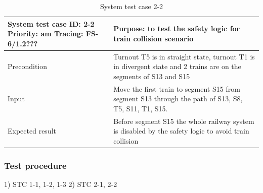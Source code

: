 \begin{table}[H]
	\caption{System test case 2-2}
	\label{table:TCase-FSS2-2}
	\begin{center}
		\renewcommand{\arraystretch}{1.8}
		\begin{tabu} 
			to 0.9 \textwidth
			{  X[0.4, c] X[c] }
			\toprule
			System test case ID: 2-2 \newline Priority: am \newline Tracing: FS-6/1.2??? & Purpose: to test the safety logic for train collision scenario                                \\ \midrule
			Precondition                                                                 & Turnout T5 is in straight state, turnout T1 is in divergent state and 2 trains are on the segments of S13 and S15                        \\
			Input                                                                        & Move the first train to segment S15 from segment S13 through the path of S13, S8, T5, S11, T1, S15. \\
			Expected result                                                              & Before segment S15 the whole railway system is disabled by the safety logic to avoid train collision                    \\ \bottomrule
		\end{tabu}
	\end{center}
\end{table}

\subsubsection{Test procedure} 
1) STC 1-1, 1-2, 1-3
2) STC 2-1, 2-2
